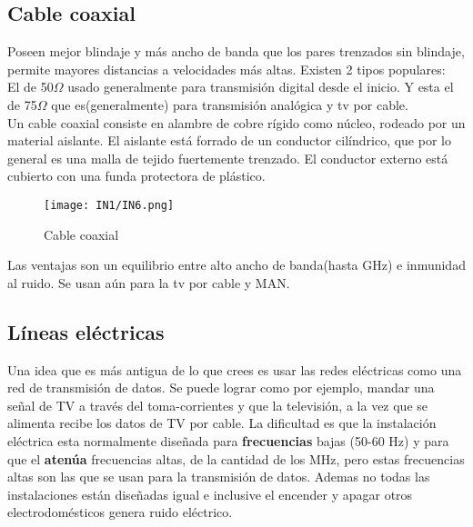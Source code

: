 \documentclass[
	12pt, %
	fleqn, %
	a4paper, %
	oneside, %
]{LegrandOrangeBook}
\begin{document}
\subsection{Cable coaxial}
Poseen mejor blindaje y más ancho de banda que los pares trenzados sin blindaje, permite mayores distancias a velocidades más altas. Existen 2 tipos populares:\\
El de 50$\Omega$ usado generalmente para transmisión digital desde el inicio. Y esta el de 75$\Omega$ que es(generalmente) para transmisión analógica y tv por cable.\\
Un cable coaxial consiste en alambre de cobre rígido como núcleo, rodeado por un material aislante. El aislante está forrado de un conductor cilíndrico, que por lo general es una malla de tejido fuertemente trenzado. El conductor externo está cubierto con una funda protectora de plástico.
\begin{figure}[H]
\centering
\texttt{[image: IN1/IN6.png]}
\caption{Cable coaxial}
\label{fig:utp cat 5}
\end{figure}
Las ventajas son un equilibrio entre alto ancho de banda(hasta GHz) e inmunidad al ruido. Se usan aún para la tv por cable y MAN.
\subsection{Líneas eléctricas}
Una idea que es más antigua de lo que crees es usar las redes eléctricas como una red de transmisión de datos. Se puede lograr como por ejemplo, mandar una señal de TV a través del toma-corrientes y que la televisión, a la vez que se alimenta recibe los datos de TV por cable. La dificultad es que la instalación eléctrica esta normalmente diseñada para \textbf{frecuencias} bajas (50-60 Hz) y para que el \textbf{atenúa} frecuencias altas, de la cantidad de los MHz, pero estas frecuencias altas son las que se usan para la transmisión de datos. Ademas no todas las instalaciones están diseñadas igual e inclusive el encender y apagar otros electrodomésticos genera ruido eléctrico.
\end{document}
